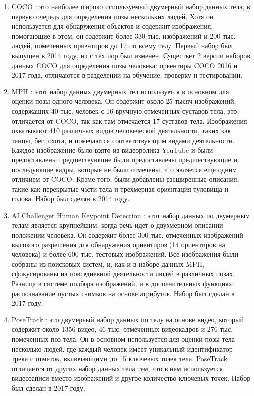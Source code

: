  
\begin{enumerate}[label=\arabic*)]
	
	\item COCO \cite{COCO}: это наиболее широко используемый двумерный набор данных тела, в первую очередь для определения позы нескольких людей.
	Хотя он используется для обнаружения объектов и содержит изображения, помогающие в этом, он содержит более 330 тыс. изображений и 200 тыс. людей, помеченных ориентиров до 17 по всему телу.
	Первый набор был выпущен в 2014 году, но с тех пор был изменен.
	Существет 2 версии наборов данных COCO для определения позы человека: ориентиры COCO 2016 и 2017 года, отличаются в разделении на обучение, проверку и тестировании.
	
	\item  MPII \cite{MPII}: этот набор данных двумерных тел используется в основном для оценки позы одного человека.
	Он содержит около 25 тысяч изображений, содержащих 40 тыс. человек с 16 вручную отмеченных суставов тела, это отличается от COCO, так как там отмечается 17 суставов тела.
	Изображения охватывают 410 различных видов человеческой деятельности, таких как танцы, бег, охота, и помечаются соответствующим видами деятельности.
	Каждое изображение было взято из видеоролика YouTube и были предоставлены предшествующие были предоставлены предшествующие и последующие кадры, которые не были отмечены, что является еще одним отличием от COCO. 
	Кроме того, были добавлены расширенные описания, такие как перекрытые части тела и трехмерная ориентация туловища и голова.
	Набор был сделан в 2014 году.
	
	\item AI Challenger Human Keypoint Detection \cite{AI_chlenger}: этот набор данных по двумерным телам является крупнейшим, когда речь идет о двухмерном описании положении человека.
	Он содержит более 300 тыс. отмеченных изображений высокого разрешения для обнаружения ориентиров (14 ориентиров на человека) и более 600 тыс. тестовых изображений.
	Все изображения были собраны из поисковых систем, и, как и в наборе данных MPII, сфокусированы на повседневной деятельности людей в различных позах.
	Разница в системе подбора изображений, и в дополнительных функциях: распознавание пустых снимков на основе атрибутов.
	Набор был сделан в 2017 году.
	
	\item PoseTrack \cite{PoseTrack}: это двумерный набор данных по телу на основе видео, который содержит около 1356 видео, 46 тыс. отмеченных видеокадров и 276 тыс. помеченных поз тела.
	Он в основном используется для оценки позы тела несколько людей, где каждый человек имеет уникальный идентификатор трека с отметок, включающими до 15 ключевых точек тела.
	PoseTrack отличается от других набор данных тела тем, что в нем используется видеозаписи вместо изображений и другое количество ключевых точек.
	Набор был сделан в 2017 году.
	
\end{enumerate}

